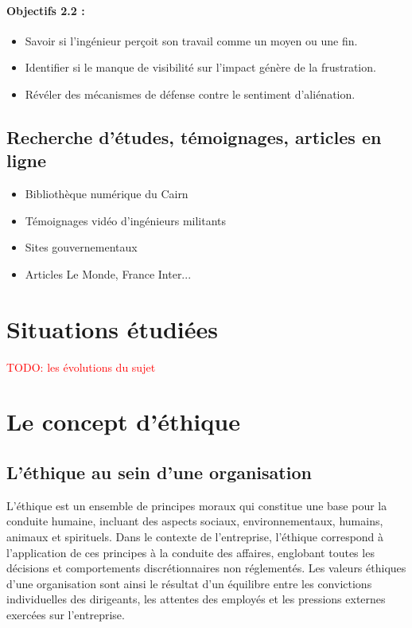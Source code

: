 \documentclass[12pt,a4paper]{report}
\begin{document}
\paragraph{Objectifs 2.2 :}
\begin{itemize}
    \item Savoir si l'ingénieur perçoit son travail comme un moyen ou une fin.
    \item Identifier si le manque de visibilité sur l'impact génère de la frustration.
    \item Révéler des mécanismes de défense contre le sentiment d'aliénation.
\end{itemize}

\subsection{Recherche d'études, témoignages, articles en ligne}

\begin{itemize}
    \item Bibliothèque numérique du Cairn
    \item Témoignages vidéo d'ingénieurs militants
    \item Sites gouvernementaux
    \item Articles Le Monde, France Inter...
\end{itemize}

\section{Situations étudiées}

\textcolor{red}{TODO: les évolutions du sujet}

\section{Le concept d'éthique}

\subsection{L'éthique au sein d'une organisation}

L'éthique est un ensemble de principes moraux qui constitue une base pour la conduite humaine, incluant des aspects sociaux, environnementaux, humains, animaux et spirituels. Dans le contexte de l'entreprise, l'éthique correspond à l'application de ces principes à la conduite des affaires, englobant toutes les décisions et comportements discrétionnaires non réglementés. Les valeurs éthiques d'une organisation sont ainsi le résultat d'un équilibre entre les convictions individuelles des dirigeants, les attentes des employés et les pressions externes exercées sur l'entreprise.
\end{document}
